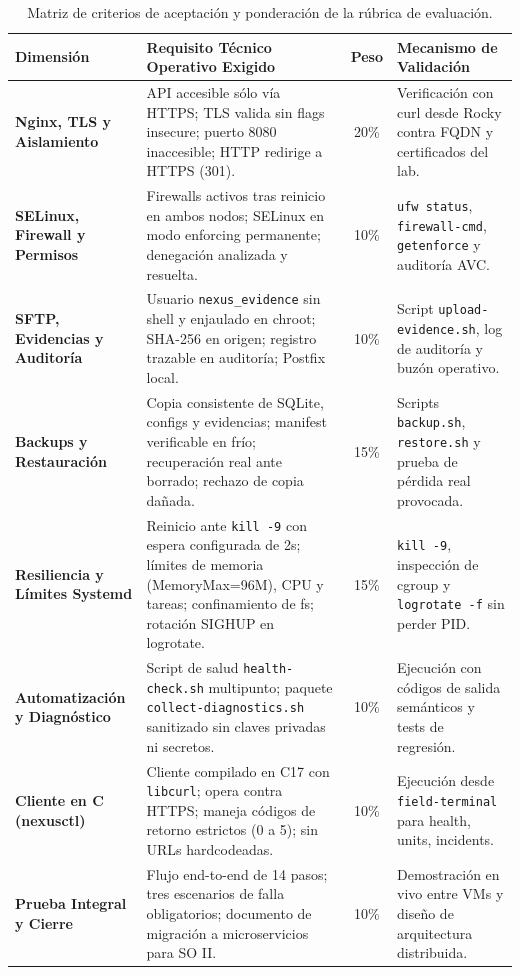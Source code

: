 \documentclass[10pt,a4paper]{article}
\begin{document}
\begin{table}[H]
    \centering
    \footnotesize
    \caption{Matriz de criterios de aceptación y ponderación de la rúbrica de evaluación.}
    \label{tab:criterios_evaluacion}
    \begin{tabularx}{\textwidth}{>{\raggedright\arraybackslash}p{3.2cm}Xc>{\raggedright\arraybackslash}p{4.0cm}}
        \toprule
        \rowcolor{tableheader}
        \textbf{Dimensión} & \textbf{Requisito Técnico Operativo Exigido} & \textbf{Peso} & \textbf{Mecanismo de Validación} \\
        \midrule
        \textbf{Nginx, TLS y Aislamiento} & API accesible sólo vía HTTPS; TLS valida sin flags insecure; puerto 8080 inaccesible; HTTP redirige a HTTPS (301). & 20\% & Verificación con curl desde Rocky contra FQDN y certificados del lab. \\
        \rowcolor{rowalt}
        \textbf{SELinux, Firewall y Permisos} & Firewalls activos tras reinicio en ambos nodos; SELinux en modo enforcing permanente; denegación analizada y resuelta. & 10\% & \texttt{ufw status}, \texttt{firewall-cmd}, \texttt{getenforce} y auditoría AVC. \\
        \textbf{SFTP, Evidencias y Auditoría} & Usuario \texttt{nexus\_evidence} sin shell y enjaulado en chroot; SHA-256 en origen; registro trazable en auditoría; Postfix local. & 10\% & Script \texttt{upload-evidence.sh}, log de auditoría y buzón operativo. \\
        \rowcolor{rowalt}
        \textbf{Backups y Restauración} & Copia consistente de SQLite, configs y evidencias; manifest verificable en frío; recuperación real ante borrado; rechazo de copia dañada. & 15\% & Scripts \texttt{backup.sh}, \texttt{restore.sh} y prueba de pérdida real provocada. \\
        \textbf{Resiliencia y Límites Systemd} & Reinicio ante \texttt{kill -9} con espera configurada de 2s; límites de memoria (MemoryMax=96M), CPU y tareas; confinamiento de fs; rotación SIGHUP en logrotate. & 15\% & \texttt{kill -9}, inspección de cgroup y \texttt{logrotate -f} sin perder PID. \\
        \rowcolor{rowalt}
        \textbf{Automatización y Diagnóstico} & Script de salud \texttt{health-check.sh} multipunto; paquete \texttt{collect-diagnostics.sh} sanitizado sin claves privadas ni secretos. & 10\% & Ejecución con códigos de salida semánticos y tests de regresión. \\
        \textbf{Cliente en C (nexusctl)} & Cliente compilado en C17 con \texttt{libcurl}; opera contra HTTPS; maneja códigos de retorno estrictos (0 a 5); sin URLs hardcodeadas. & 10\% & Ejecución desde \texttt{field-terminal} para health, units, incidents. \\
        \rowcolor{rowalt}
        \textbf{Prueba Integral y Cierre} & Flujo end-to-end de 14 pasos; tres escenarios de falla obligatorios; documento de migración a microservicios para SO II. & 10\% & Demostración en vivo entre VMs y diseño de arquitectura distribuida. \\
        \bottomrule
    \end{tabularx}
\end{table}
\end{document}
